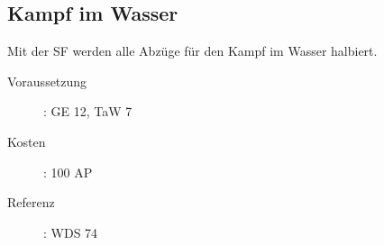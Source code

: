 \subsection{Kampf im Wasser}
\label{sf.kampf_im_wasser}
Mit der SF  werden alle Abzüge für den Kampf im Wasser halbiert.
\begin{description}
    \item[Voraussetzung]:
        GE 12, TaW  7
    \item [Kosten]:
        100 AP
    \item [Referenz]:
        WDS 74
\end{description}
